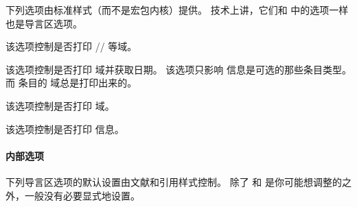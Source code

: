 
下列选项由标准样式（而不是宏包内核）提供。
技术上讲，它们和  中的选项一样也是导言区选项。

\begin{optionlist}


该选项控制是否打印 \slash {}\slash {} 等域。


该选项控制是否打印  域并获取日期。
该选项只影响  信息是可选的那些条目类型。
而  条目的  域总是打印出来的。


该选项控制是否打印  域。


该选项控制是否打印  信息。

\end{optionlist}

\paragraph{内部选项}%
\label{use:opt:pre:int}


下列导言区选项的默认设置由文献和引用样式控制。
除了  和  是你可能想调整的之外，一般没有必要显式地设置。


